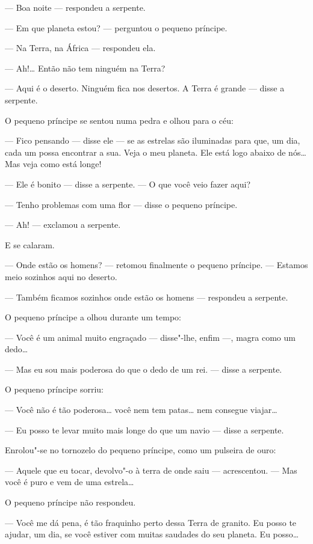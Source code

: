 \begin{Parallel}[p]{}{}
{--- Boa noite --- respondeu a serpente.

--- Em que planeta estou? --- perguntou o pequeno príncipe.

--- Na Terra, na África --- respondeu ela.

--- Ah!\ldots{} Então não tem ninguém na Terra?

--- Aqui é o deserto. Ninguém fica nos desertos. A Terra é grande --- disse
a serpente.

O pequeno príncipe se sentou numa pedra e olhou para o céu:

--- Fico pensando --- disse ele --- se as estrelas são iluminadas para que,
um dia, cada um possa encontrar a sua. Veja o meu planeta. Ele está logo
abaixo de nós\ldots{} Mas veja como está longe!

--- Ele é bonito --- disse a serpente. --- O que você veio fazer aqui?

--- Tenho problemas com uma flor --- disse o pequeno príncipe.

--- Ah! --- exclamou a serpente.

E se calaram.

--- Onde estão os homens? --- retomou finalmente o pequeno príncipe. ---
Estamos meio sozinhos aqui no deserto.

--- Também ficamos sozinhos onde estão os homens --- respondeu a serpente.

O pequeno príncipe a olhou durante um tempo:

--- Você é um animal muito engraçado --- disse"-lhe, enfim ---, magra como um
dedo\ldots{}

--- Mas eu sou mais poderosa do que o dedo de um rei. --- disse a serpente.

O pequeno príncipe sorriu:

--- Você não é tão poderosa\ldots{} você nem tem patas\ldots{} nem consegue
viajar\ldots{}

--- Eu posso te levar muito mais longe do que um navio --- disse a
serpente.

Enrolou"-se no tornozelo do pequeno príncipe, como um pulseira de ouro:

--- Aquele que eu tocar, devolvo"-o à terra de onde saiu --- acrescentou. ---
Mas você é puro e vem de uma estrela\ldots{}

O pequeno príncipe não respondeu.

--- Você me dá pena, é tão fraquinho perto dessa Terra de granito. Eu
posso te ajudar, um dia, se você estiver com muitas saudades do seu
planeta. Eu posso\ldots{}

}
\end{Parallel}
